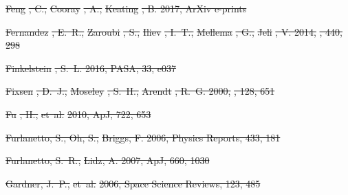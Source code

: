 \documentclass[numberedappendix]{emulateapj}
\providecommand{\DIFdel}[1]{{\protect\color{red}\sout{#1}}}                      %
\begin{document}
\DIFdel{Feng}%
\DIFdel{, C., }%
\DIFdel{Cooray}%
\DIFdel{, A., }%
\DIFdel{Keating}%
\DIFdel{, B. 2017, ArXiv e-prints
}%

\DIFdel{Fernandez}%
\DIFdel{, E.~R., }%
\DIFdel{Zaroubi}%
\DIFdel{, S., }%
\DIFdel{Iliev}%
\DIFdel{, I.~T., }%
\DIFdel{Mellema}%
\DIFdel{, G., }%
\DIFdel{Jeli}%
\DIFdel{, V. 2014, }%
\DIFdel{, 440, 298
}%

\DIFdel{Finkelstein}%
\DIFdel{, S.~L. 2016, PASA, 33, e037
}%

\DIFdel{Fixsen}%
\DIFdel{, D.~J., }%
\DIFdel{Moseley}%
\DIFdel{, S.~H., }%
\DIFdel{Arendt}%
\DIFdel{, R.~G. 2000, }%
\DIFdel{, 128, 651
}%

\DIFdel{Fu}%
\DIFdel{, H., }%
\DIFdel{et~al.}%
\DIFdel{2010, ApJ, 722, 653
}%

\DIFdel{Furlanetto, S., Oh, S., }%
\DIFdel{Briggs, F. 2006, Physics Reports, 433, 181
}%

\DIFdel{Furlanetto, S.~R., }%
\DIFdel{Lidz, A. 2007, ApJ, 660, 1030
}%

\DIFdel{Gardner, J.~P., }%
\DIFdel{et~al.}%
\DIFdel{2006, Space Science Reviews, 123, 485
}%
\end{document}
